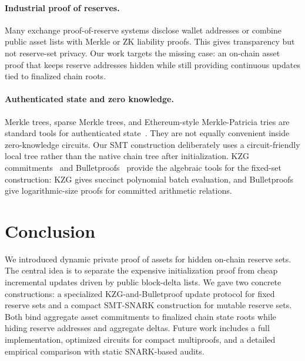 \documentclass[runningheads]{llncs}
\begin{document}
\paragraph{Industrial proof of reserves.}
Many exchange proof-of-reserve systems disclose wallet addresses or combine public asset lists with Merkle or ZK liability proofs.  This gives transparency but not reserve-set privacy.  Our work targets the missing case: an on-chain asset proof that keeps reserve addresses hidden while still providing continuous updates tied to finalized chain roots.

\paragraph{Authenticated state and zero knowledge.}
Merkle trees, sparse Merkle trees, and Ethereum-style Merkle-Patricia tries are standard tools for authenticated state~\cite{Merkle88,WoodYellowPaper,MPTdoc}.  They are not equally convenient inside zero-knowledge circuits.  Our SMT construction deliberately uses a circuit-friendly local tree rather than the native chain tree after initialization.  KZG commitments~\cite{KZG10} and Bulletproofs~\cite{Bulletproofs18} provide the algebraic tools for the fixed-set construction: KZG gives succinct polynomial batch evaluation, and Bulletproofs give logarithmic-size proofs for committed arithmetic relations.

\section{Conclusion}

We introduced dynamic private proof of assets for hidden on-chain reserve sets.  The central idea is to separate the expensive initialization proof from cheap incremental updates driven by public block-delta lists.  We gave two concrete constructions: a specialized KZG-and-Bulletproof update protocol for fixed reserve sets and a compact SMT-SNARK construction for mutable reserve sets.  Both bind aggregate asset commitments to finalized chain state roots while hiding reserve addresses and aggregate deltas.  Future work includes a full implementation, optimized circuits for compact multiproofs, and a detailed empirical comparison with static SNARK-based audits.
\end{document}
